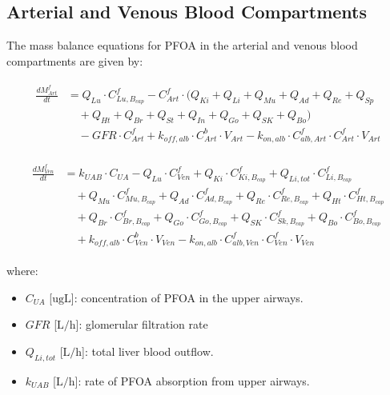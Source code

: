 \documentclass[preprint,12pt,authoryear]{elsarticle}
\begin{document}
\subsection{Arterial and Venous Blood Compartments}

The mass balance equations for PFOA in the arterial and venous blood compartments are given by:

\begin{align}
\begin{aligned}
\frac{dM_{Art}^f}{dt} &= Q_{Lu} \cdot C_{Lu,B_{cap}}^f 
- C_{Art}^f \cdot (Q_{Ki} + Q_{Li} + Q_{Mu} + Q_{Ad} + Q_{Re} + Q_{Sp}\\
& \quad  + Q_{Ht} + Q_{Br} + Q_{St} + Q_{In} + Q_{Go} + Q_{SK} + Q_{Bo})
\\
& \quad - GFR \cdot C_{Art}^f + k_{off,alb} \cdot C_{Art}^b \cdot V_{Art}
- k_{on,alb} \cdot C_{alb,Art}^f \cdot C_{Art}^f \cdot V_{Art}
\end{aligned}
\label{eq:PFOA_arterial_blood}
\end{align}

\begin{align}
\begin{aligned}
\frac{dM_{Ven}^f}{dt} &= k_{UAB} \cdot C_{UA}
- Q_{Lu} \cdot C_{Ven}^f 
+ Q_{Ki} \cdot C_{Ki,B_{cap}}^f 
+ Q_{Li, tot} \cdot C_{Li,B_{cap}}^f \\
& \quad 
+ Q_{Mu} \cdot C_{Mu,B_{cap}}^f 
+ Q_{Ad} \cdot C_{Ad,B_{cap}}^f + Q_{Re} \cdot C_{Re,B_{cap}}^f 
+ Q_{Ht} \cdot C_{Ht,B_{cap}}^f \\
& \quad 
+ Q_{Br} \cdot C_{Br,B_{cap}}^f 
+ Q_{Go} \cdot C_{Go,B_{cap}}^f 
+ Q_{SK} \cdot C_{Sk,B_{cap}}^f 
+ Q_{Bo} \cdot C_{Bo,B_{cap}}^f \\
& \quad + k_{off,alb} \cdot C_{Ven}^b \cdot V_{Ven}
- k_{on,alb} \cdot C_{alb,Ven}^f \cdot C_{Ven}^f \cdot V_{Ven}
\end{aligned}
\label{eq:PFOA_venous_blood}
\end{align}


\noindent
where:
\begin{itemize}
   
    \item $C_{UA}$ [$\text{ug}\text{L}$]: concentration of PFOA in the upper airways.
    \item $GFR$ [$\text{L}/\text{h}$]: glomerular filtration rate 
    \item $Q_{Li, tot}$ [$\text{L}/\text{h}$]: total liver blood outflow.
    \item $k_{UAB}$ [$\text{L}/\text{h}$]: rate of PFOA absorption from upper airways.
\end{itemize}
\end{document}
